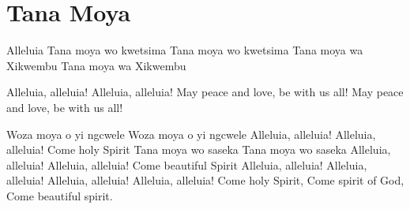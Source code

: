 \starttocol
\chapter{Tana Moya}
\nexttocol
{\sc Alleluia}\hfill{\it }
\stoptocol
\starttocol
\startlines
T{\sc ana} moya wo kwetsima   
Tana moya wo kwetsima
Tana moya wa Xikwembu  
Tana moya wa Xikwembu

Alleluia, alleluia!
Alleluia, alleluia!
May peace and love, be with us all!
May peace and love, be with us all!

Woza moya o yi ngcwele  
Woza moya o yi ngcwele
Alleluia, alleluia!
Alleluia, alleluia!
\stoplines
\nexttocol
Come holy Spirit
\stoptocol
\starttocol
\startlines
Tana moya wo saseka  
Tana moya wo saseka
Alleluia, alleluia!
Alleluia, alleluia!
\stoplines
\nexttocol
Come beautiful Spirit
\stoptocol
\starttocol
\startlines
Alleluia, alleluia!
Alleluia, alleluia!
Alleluia, alleluia!
Alleluia, alleluia!
\stoplines
\nexttocol
Come holy Spirit, Come spirit of God, Come beautiful spirit.
\stoptocol
